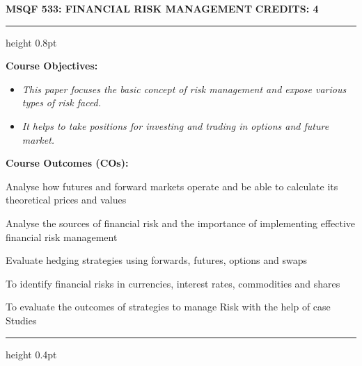 
\newpage
\thispagestyle{plain}

\begin{center}
    {\large\textbf{MSQF 533: FINANCIAL RISK MANAGEMENT}} \hfill {\large\textbf{CREDITS: 4}}
\end{center}
\vspace{-0.7em}
\hrule height 0.8pt
\vspace{0.4em}

\noindent\textbf{\small Course Objectives:}
\begin{itemize}[leftmargin=1.2em, label=$\bullet$, noitemsep, topsep=1pt, parsep=0pt]
    \footnotesize
    \item \textit{This paper focuses the basic concept of risk management and expose various types of risk faced.}
    \item \textit{It helps to take positions for investing and trading in options and future market.}
\end{itemize}

\vspace{0.25em}
\noindent\textbf{\small Course Outcomes (COs):}
\begin{description}[leftmargin=1.1cm, labelsep=0.3em, itemsep=0.5pt, topsep=1pt, parsep=0pt, font=\normalfont\bfseries\footnotesize]
    \footnotesize
    \item[CO1:] Analyse how futures and forward markets operate and be able to calculate its theoretical prices and values
    \item[CO2:] Analyse the sources of financial risk and the importance of implementing effective financial risk management
    \item[CO3:] Evaluate hedging strategies using forwards, futures, options and swaps
    \item[CO4:] To identify financial risks in currencies, interest rates, commodities and shares
    \item[CO5:] To evaluate the outcomes of strategies to manage Risk with the help of case Studies
\end{description}

\vspace{0.25em}
\hrule height 0.4pt
\vspace{0.3em}

